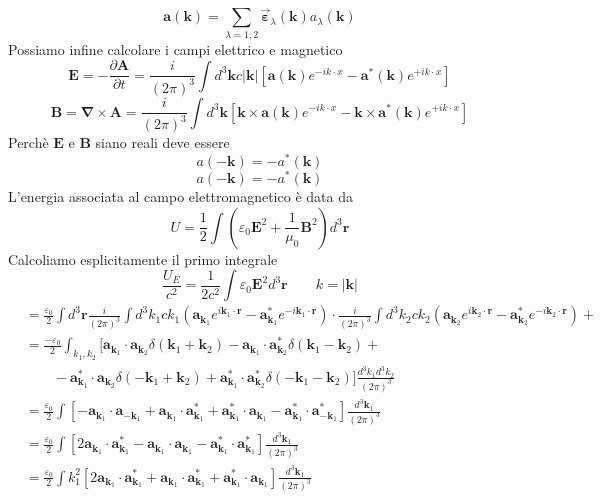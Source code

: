 $$
\mathbf{a}(\mathbf{k}) = \sum_{\lambda=1,2} \Vec{\boldsymbol{\varepsilon}}_\lambda(\mathbf{k}) a_\lambda(\mathbf{k})
$$
Possiamo infine calcolare i campi elettrico e magnetico
$$
\mathbf{E} = -\frac{\partial \mathbf{A}}{\partial t} = \frac{i}{(2\pi)^3} \int d^3\mathbf{k} c|\mathbf{k}| [\mathbf{a}(\mathbf{k}) e^{-ik\cdot x} - \mathbf{a}^*(\mathbf{k}) e^{+ik\cdot x}]
$$
$$
\mathbf{B} = \boldsymbol{\nabla} \times \mathbf{A} = \frac{i}{(2\pi)^3} \int d^3\mathbf{k} [\mathbf{k} \times \mathbf{a}(\mathbf{k}) e^{-ik\cdot x} - \mathbf{k} \times \mathbf{a}^*(\mathbf{k}) e^{+ik\cdot x}]
$$
Perchè $\mathbf{E}$ e $\mathbf{B}$ siano reali deve essere
$$
a(-\mathbf{k}) = -a^*(\mathbf{k})
$$
$$
a(-\mathbf{k}) = -a^*(\mathbf{k})
$$
L'energia associata al campo elettromagnetico è data da
$$
U = \frac{1}{2} \int \left( \varepsilon_0 \mathbf{E}^2 + \frac{1}{\mu_0} \mathbf{B}^2 \right) d^3\mathbf{r}
$$
Calcoliamo esplicitamente il primo integrale
$$
\frac{U_E}{c^2} = \frac{1}{2c^2} \int \varepsilon_0 \mathbf{E}^2 d^3\mathbf{r} \qquad k = |\mathbf{k}|
$$
\begin{align*}
&= \frac{\varepsilon_0}{2} \int d^3\mathbf{r} \frac{i}{(2\pi)^3} \int d^3k_1 c k_1 (\mathbf{a}_{\mathbf{k}_1} e^{i\mathbf{k}_1\cdot\mathbf{r}} - \mathbf{a}_{\mathbf{k}_1}^* e^{-i\mathbf{k}_1\cdot\mathbf{r}}) \cdot \frac{i}{(2\pi)^3} \int d^3k_2 c k_2 (\mathbf{a}_{\mathbf{k}_2} e^{i\mathbf{k}_2\cdot\mathbf{r}} - \mathbf{a}_{\mathbf{k}_2}^* e^{-i\mathbf{k}_2\cdot\mathbf{r}}) +\\
&= \frac{-\varepsilon_0}{2} \int_{k_1, k_2} \Biggl[ \mathbf{a}_{\mathbf{k}_1} \cdot \mathbf{a}_{\mathbf{k}_2} \delta(\mathbf{k}_1 + \mathbf{k}_2) - \mathbf{a}_{\mathbf{k}_1} \cdot \mathbf{a}_{\mathbf{k}_2}^* \delta(\mathbf{k}_1 - \mathbf{k}_2) +\\ 
& \qquad - \mathbf{a}_{\mathbf{k}_1}^* \cdot \mathbf{a}_{\mathbf{k}_2} \delta(-\mathbf{k}_1 + \mathbf{k}_2) + \mathbf{a}_{\mathbf{k}_1}^* \cdot \mathbf{a}_{\mathbf{k}_2}^* \delta(-\mathbf{k}_1 - \mathbf{k}_2) \Biggr] \frac{d^3k_1 d^3k_2}{(2\pi)^3} \\
&= \frac{\varepsilon_0}{2} \int \left[ - \mathbf{a}_{\mathbf{k}_1} \cdot \mathbf{a}_{-\mathbf{k}_1} + \mathbf{a}_{\mathbf{k}_1} \cdot \mathbf{a}_{\mathbf{k}_1}^* + \mathbf{a}_{\mathbf{k}_1}^* \cdot \mathbf{a}_{\mathbf{k}_1} - \mathbf{a}_{\mathbf{k}_1}^* \cdot \mathbf{a}_{-\mathbf{k}_1}^* \right] \frac{d^3\mathbf{k}_1}{(2\pi)^3} \\
&= \frac{\varepsilon_0}{2} \int \left[ 2 \mathbf{a}_{\mathbf{k}_1} \cdot \mathbf{a}_{\mathbf{k}_1}^* - \mathbf{a}_{\mathbf{k}_1} \cdot \mathbf{a}_{\mathbf{k}_1} - \mathbf{a}_{\mathbf{k}_1}^* \cdot \mathbf{a}_{\mathbf{k}_1}^* \right] \frac{d^3\mathbf{k}_1}{(2\pi)^3} \\
&= \frac{\varepsilon_0}{2} \int k_1^2 \left[ 2 \mathbf{a}_{\mathbf{k}_1} \cdot \mathbf{a}_{\mathbf{k}_1}^* + \mathbf{a}_{\mathbf{k}_1} \cdot \mathbf{a}_{\mathbf{k}_1}^* + \mathbf{a}_{\mathbf{k}_1}^* \cdot \mathbf{a}_{\mathbf{k}_1} \right] \frac{d^3\mathbf{k}_1}{(2\pi)^3}
\end{align*}
